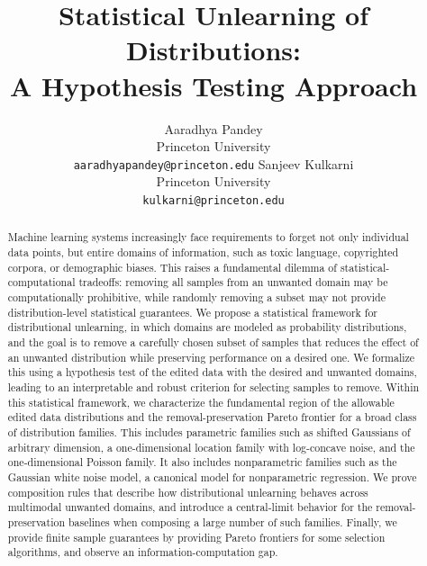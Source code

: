 \documentclass{article}
\title{Statistical Unlearning of Distributions: 
\\
A Hypothesis Testing Approach}
\author{%
  Aaradhya Pandey \\
  Princeton University\\
\texttt{aaradhyapandey@princeton.edu} 
  \And
  Sanjeev Kulkarni\\
  Princeton University \\
\texttt{kulkarni@princeton.edu} \\
}
\begin{document}
\vspace{-4 mm}
\maketitle
\vspace{-4 mm}

\begin{abstract} 
\vspace{-2 mm}
Machine learning systems increasingly face requirements to forget not only individual data points, but entire domains of information, such as toxic language, copyrighted corpora, or demographic biases. This raises a fundamental dilemma of statistical-computational tradeoffs: removing all samples from an unwanted domain may be computationally prohibitive, while randomly removing a subset may not provide distribution-level statistical guarantees.  We propose a statistical framework for distributional unlearning, in which domains are modeled as probability distributions, and the goal is to remove a carefully chosen subset of samples that reduces the effect of an unwanted distribution while preserving performance on a desired one.   We formalize this  using a hypothesis test of the edited data with the desired and unwanted domains, leading to an interpretable and robust criterion for selecting samples to remove. Within this statistical framework, we characterize the fundamental region of the allowable edited data distributions and the removal-preservation Pareto frontier for a broad class of distribution families. This includes parametric families such as shifted Gaussians of arbitrary dimension, a one-dimensional location family with log-concave noise, and the one-dimensional Poisson family. It also includes nonparametric families such as the Gaussian white noise model, a canonical model for nonparametric regression. We prove composition rules that describe how distributional unlearning behaves across multimodal unwanted domains, and introduce a central-limit behavior for the removal-preservation baselines when composing a large number of such families. Finally, we provide finite sample guarantees by providing Pareto frontiers for some selection algorithms, and observe an information-computation gap.
\vspace{-2 mm}
\end{abstract}












\appendix

\newpage
%
\end{document}
